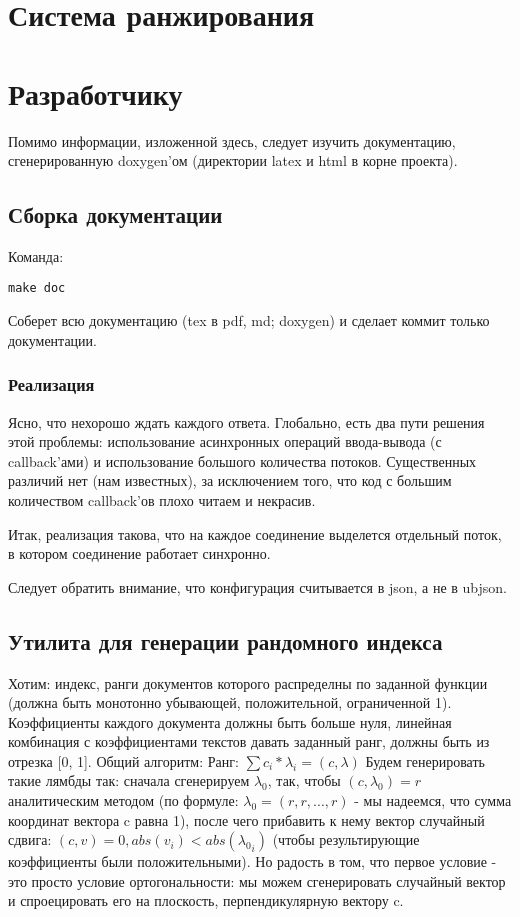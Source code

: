 \documentclass[12pt,a4paper]{article}
\begin{document}
\section{Система ранжирования}
\section{Разработчику}
Помимо информации, изложенной здесь, следует изучить документацию, сгенерированную doxygen'ом (директории latex и html в корне проекта).

\subsection{Сборка документации}
Команда:
\begin{verbatim}
make doc
\end{verbatim}
Соберет всю документацию (tex в pdf, md; doxygen) и сделает коммит только документации.




\subsubsection{Реализация}
Ясно, что нехорошо ждать каждого ответа. 
Глобально, есть два пути решения этой проблемы: использование асинхронных операций ввода-вывода (с callback'ами) и использование большого количества потоков. Существенных различий нет (нам известных), за исключением того, что код с большим количеством callback'ов плохо читаем и некрасив.

Итак, реализация такова, что на каждое соединение выделется отдельный поток, в котором соединение работает синхронно.

Следует обратить внимание, что конфигурация считывается в json, а не в ubjson.

\subsection{Утилита для генерации рандомного индекса}
Хотим: индекс, ранги документов которого распределны по заданной функции \N\rightarrow (должна быть монотонно убывающей, положительной, ограниченной 1). Коэффициенты каждого документа должны быть больше нуля, линейная комбинация с коэффициентами текстов давать заданный ранг, должны быть из отрезка [0, 1].
Общий алгоритм:
Ранг: $\sum c_i*\lambda_i = (c, \lambda)$
Будем генерировать такие лямбды так: сначала сгенерируем $\lambda_0$, так, чтобы $(c, \lambda_0) = r$ аналитическим методом (по формуле: $\lambda_0=(r, r, ..., r)$ - мы надеемся, что сумма координат вектора c равна 1), после чего прибавить к нему вектор случайный сдвига: $(c, v) = 0, abs(v_i) < abs({\lambda_0}_i)$ (чтобы результирующие коэффициенты были положительными). Но радость в том, что первое условие - это просто условие ортогональности: мы можем сгенерировать случайный вектор и спроецировать его на плоскость, перпендикулярную вектору c.
\end{document}
